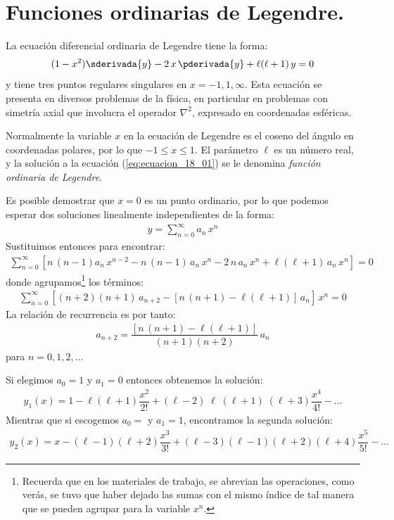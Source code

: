 \section{Funciones ordinarias de Legendre.}

La ecuación diferencial ordinaria de Legendre tiene la forma:
\begin{align}
(1 - x^{2}) \sderivada{y} - 2 \, x \, \pderivada{y} + \ell (\ell + 1) \, y = 0
\label{eq:ecuacion_18_01}
\end{align}
y tiene tres puntos regulares singulares en $x = -1, 1, \infty$. Esta ecuación se presenta en diversos problemas de la física, en particular en problemas con simetría axial que involucra el operador $\nabla^{2}$, expresado en coordenadas esféricas.
\par
Normalmente la variable $x$ en la ecuación de Legendre es el coseno del ángulo en coordenadas polares, por lo que $-1 \leq x \leq 1$. El parámetro $\ell$ es un número real, y la solución a la ecuación (\ref{eq:ecuacion_18_01}) se le denomina \emph{función ordinaria de Legendre}.
\par
Es posible demostrar que $x = 0$ es un punto ordinario, por lo que podemos esperar dos soluciones linealmente independientes de la forma:
\begin{align*}
y = \sum_{n=0}^{\infty} a_{n} \, x^{n}
\end{align*}
Sustituimos entonces para encontrar:
\begin{align*}
\sum_{n=0}^{\infty} \left[ n \, (n - 1) a_{n} \, x^{n-2} - n \, (n - 1) \, a_{n} \, x^{n} - 2 \, n \, a_{n} \, x^{n} + \ell (\ell + 1) \, a_{n} \, x^{n} \right] = 0
\end{align*}
donde agrupamos\footnote{Recuerda que en los materiales de trabajo, se abrevian las operaciones, como verás, se tuvo que haber dejado las sumas con el mismo índice de tal manera que se pueden agrupar para la variable $x^{n}$.} los términos:
\begin{align*}
\sum_{n=0}^{\infty} \left[ (n + 2)(n + 1) \, a_{n+2} - [ n \, (n+1) - \ell (\ell + 1) ] \, a_{n} \right] \, x^{n} = 0
\end{align*}
La relación de recurrencia es por tanto:
\begin{align}
a_{n+2} = \dfrac{[n \, (n + 1)- \ell (\ell + 1)]}{(n + 1)(n + 2)} \, a_{n}
\label{eq:ecuacion_18_02}
\end{align}
para $n = 0, 1, 2, \ldots$
\par
Si elegimos $a_{0} = 1$ y $a_{1} = 0$ entonces obtenemos la solución:
\begin{align}
y_{1} (x) = 1 - \ell (\ell + 1) \dfrac{x^{2}}{2!} + (\ell - 2)\; \ell \; (\ell + 1)\;(\ell + 3) \dfrac{x^{4}}{4!} - \ldots
\label{eq:ecuacion_18_03}
\end{align}
Mientras que si escogemos $a_{0} = $ y $ a_{1} = 1 $, encontramos la segunda solución:
\begin{align}
y_{2} (x) = x - (\ell - 1)(\ell + 2) \dfrac{x^{3}}{3!} + (\ell - 3) (\ell - 1)(\ell + 2)(\ell + 4) \dfrac{x^{5}}{5!} - \ldots
\label{eq:ecuacion_18_04}
\end{align}


